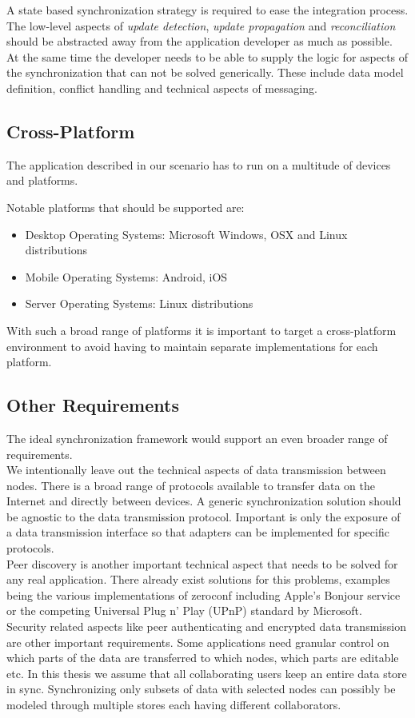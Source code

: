 A state based synchronization strategy is required to ease the integration process. The low-level aspects of \emph{update detection}, \emph{update propagation} and \emph{reconciliation} should be abstracted away from the application developer as much as possible.\\
At the same time the developer needs to be able to supply the logic for aspects of the synchronization that can not be solved generically. These include data model definition, conflict handling and technical aspects of messaging.

\subsection{Cross-Platform}
The application described in our scenario has to run on a multitude of devices and platforms.

Notable platforms that should be supported are:

\begin{itemize}
\item Desktop Operating Systems: Microsoft Windows, OSX and Linux distributions
\item Mobile Operating Systems: Android, iOS
\item Server Operating Systems: Linux distributions
\end{itemize}

With such a broad range of platforms it is important to target a cross-platform environment to avoid having to maintain separate implementations for each platform.

\subsection{Other Requirements}
The ideal synchronization framework would support an even broader range of requirements.\\
We intentionally leave out the technical aspects of data transmission between nodes.
There is a broad range of protocols available to transfer data on the Internet and directly between devices.
A generic synchronization solution should be agnostic to the data transmission protocol.
Important is only the exposure of a data transmission interface so that adapters can be implemented for specific protocols.\\
Peer discovery is another important technical aspect that needs to be solved for any real application.
There already exist solutions for this problems, examples being the various implementations of zeroconf \cite{gunes2002ip} including Apple's Bonjour service or the competing Universal Plug n' Play (UPnP) \cite{miller2001home} standard by Microsoft.\\
Security related aspects like peer authenticating and encrypted data transmission are other important requirements.
Some applications need granular control on which parts of the data are transferred to which nodes, which parts are editable etc.
In this thesis we assume that all collaborating users keep an entire data store in sync.
Synchronizing only subsets of data with selected nodes can possibly be modeled through multiple stores each having different collaborators.


